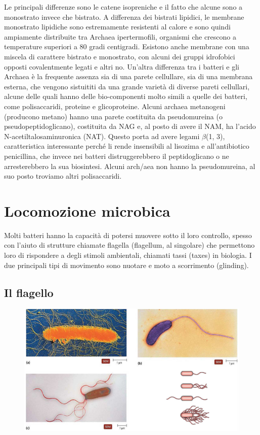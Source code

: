 Le principali differenze sono le catene isopreniche e il fatto che alcune sono 
a monostrato invece che bistrato. A differenza dei bistrati lipidici, le membrane monostrato lipidiche sono estremamente resistenti al calore e sono quindi 
ampiamente distribuite tra Archaea ipertermofili, organismi che crescono a temperature superiori a 80 gradi centigradi. Esistono anche membrane con una 
miscela di carattere bistrato e monostrato, con alcuni dei gruppi idrofobici opposti covalentmente legati e altri no. Un’altra differenza tra i batteri e 
gli Archaea è la frequente assenza sia di una parete cellullare, sia di una membrana esterna, che vengono sistuititi da una grande varietà di diverse pareti 
cellullari, alcune delle quali hanno delle bio-componenti molto simili a quelle dei batteri, come polisaccaridi, proteine e glicoproteine. Alcuni archaea 
metanogeni (producono metano) hanno una parete costituita da pseudomureina (o pseudopeptidoglicano), costituita da NAG e, al posto di avere il NAM, ha 
l’acido N-acetiltalosaminuronica (NAT). Questo porta ad avere legami $\beta$(1, 3), caratteristica interessante perché li rende insensibili al lisozima e 
all’antibiotico penicillina, che invece nei batteri distruggerebbero il peptidoglicano o ne arresterebbero la sua biosintesi. Alcuni arch/aea non hanno la 
pseudomureina, al suo posto troviamo altri polisaccaridi.
\section{Locomozione microbica}
Molti batteri hanno la capacità di potersi muovere sotto il loro controllo, spesso con l’aiuto di strutture chiamate flagella (flagellum, al singolare) che 
permettono loro di rispondere a degli stimoli ambientali, chiamati tassi (taxes) in biologia. I due principali tipi di movimento sono nuotare e moto a 
scorrimento (glinding). 
\subsection{Il flagello}
\begin{figure}[H]
	\includegraphics[width=\textwidth]{Pictures/14.png}
\end{figure}


